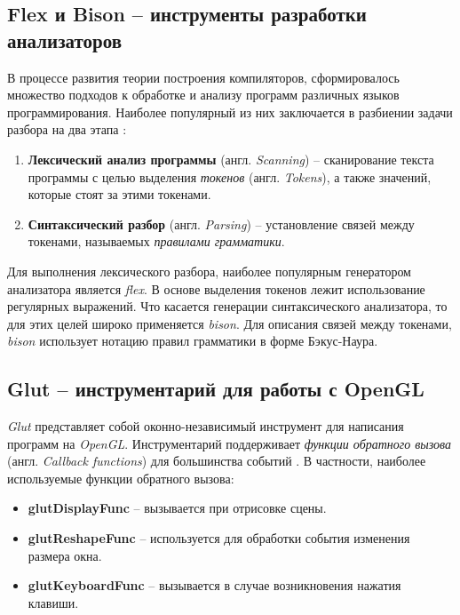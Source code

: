 \documentclass[12pt]{article}
\begin{document}
		\subsection{Flex и Bison -- инструменты разработки анализаторов}
		\hspace{\parindent} В процессе развития теории построения компиляторов, сформировалось множество подходов к обработке и анализу программ различных языков программирования. Наиболее популярный из них заключается в разбиении задачи разбора на два этапа \cite[стр.~21]{flexManual}:
		\begin{enumerate}
			\item {\bf Лексический анализ программы} (англ. {\it Scanning}) -- сканирование текста программы с целью выделения {\it токенов} (англ. {\it Tokens}), а также значений, которые стоят за этими токенами.
			\item {\bf Синтаксический разбор} (англ. {\it Parsing}) -- установление связей между токенами, называемых {\it правилами грамматики}. 
		\end{enumerate}
		
		\indent Для выполнения лексического разбора, наиболее популярным генератором анализатора является {\it flex}. В основе выделения токенов лежит использование регулярных выражений. Что касается генерации синтаксического анализатора, то для этих целей широко применяется {\it bison}. Для описания связей между токенами, {\it bison} использует нотацию правил грамматики в форме Бэкус-Наура.	
		\subsection{Glut -- инструментарий для работы с OpenGL}
		\hspace{\parindent} {\it Glut} представляет собой оконно-независимый инструмент для написания программ на {\it OpenGL}. Инструментарий поддерживает {\it функции обратного вызова} (англ. {\it Callback functions}) для большинства событий \cite{glutCallbacks}. В частности, наиболее используемые функции обратного вызова:
		\begin{itemize}
			\item {\bf glutDisplayFunc} -- вызывается при отрисовке сцены.
			\item {\bf glutReshapeFunc} -- используется для обработки события изменения размера окна.
			\item {\bf glutKeyboardFunc} -- вызывается в случае возникновения нажатия клавиши.
		\end{itemize}
		
\end{document}
